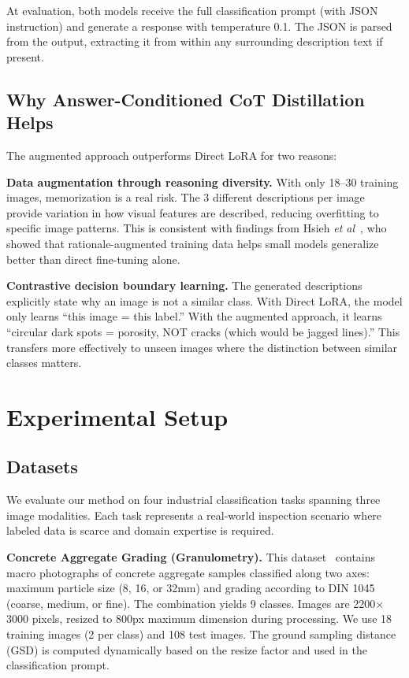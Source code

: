 \documentclass{bmvc2k}
\def\etal{\emph{et al}\bmvaOneDot}
\begin{document}
At evaluation, both models receive the full classification prompt (with JSON instruction) and generate a response with temperature 0.1. The JSON is parsed from the output, extracting it from within any surrounding description text if present.

\subsection{Why Answer-Conditioned CoT Distillation Helps}

The augmented approach outperforms Direct LoRA for two reasons:

\noindent\textbf{Data augmentation through reasoning diversity.} With only 18--30 training images, memorization is a real risk. The 3 different descriptions per image provide variation in how visual features are described, reducing overfitting to specific image patterns. This is consistent with findings from Hsieh \etal~\cite{hsieh2023distilling}, who showed that rationale-augmented training data helps small models generalize better than direct fine-tuning alone.

\noindent\textbf{Contrastive decision boundary learning.} The generated descriptions explicitly state why an image is not a similar class. With Direct LoRA, the model only learns ``this image = this label.'' With the augmented approach, it learns ``circular dark spots = porosity, NOT cracks (which would be jagged lines).'' This transfers more effectively to unseen images where the distinction between similar classes matters.


\section{Experimental Setup}
\label{sec:experiments}

\subsection{Datasets}

We evaluate our method on four industrial classification tasks spanning three image modalities. Each task represents a real-world inspection scenario where labeled data is scarce and domain expertise is required.

\noindent\textbf{Concrete Aggregate Grading (Granulometry).} This dataset~\cite{coenen2022learning} contains macro photographs of concrete aggregate samples classified along two axes: maximum particle size (8, 16, or 32mm) and grading according to DIN 1045~\cite{din1045} (coarse, medium, or fine). The combination yields 9 classes. Images are 2200$\times$3000 pixels, resized to 800px maximum dimension during processing. We use 18 training images (2 per class) and 108 test images. The ground sampling distance (GSD) is computed dynamically based on the resize factor and used in the classification prompt.
\end{document}
